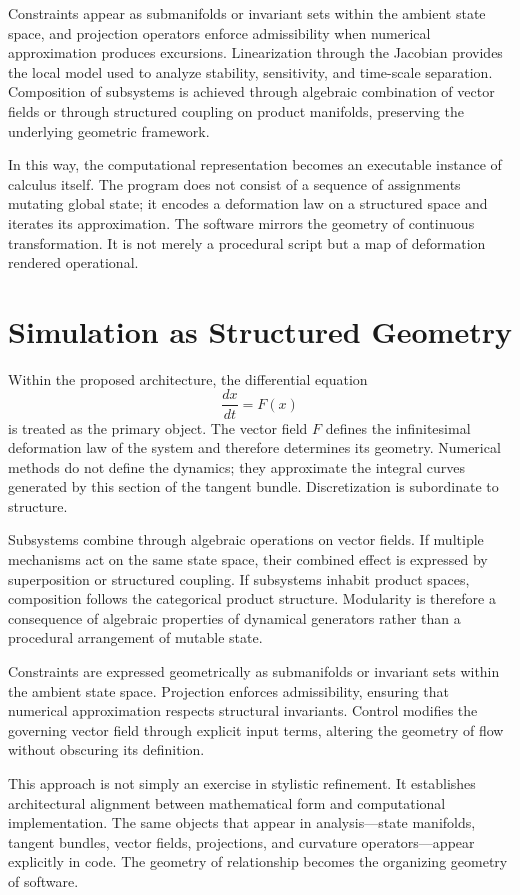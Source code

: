 \documentclass[12pt]{book}
\begin{document}
Constraints appear as submanifolds or invariant sets within the ambient
state space, and projection operators enforce admissibility when
numerical approximation produces excursions. Linearization through the
Jacobian provides the local model used to analyze stability, sensitivity,
and time-scale separation. Composition of subsystems is achieved through
algebraic combination of vector fields or through structured coupling
on product manifolds, preserving the underlying geometric framework.

In this way, the computational representation becomes an executable
instance of calculus itself. The program does not consist of a sequence
of assignments mutating global state; it encodes a deformation law on
a structured space and iterates its approximation. The software mirrors
the geometry of continuous transformation. It is not merely a procedural
script but a map of deformation rendered operational.

\section{Simulation as Structured Geometry}

Within the proposed architecture, the differential equation
\[
\frac{dx}{dt} = F(x)
\]
is treated as the primary object. The vector field $F$ defines the
infinitesimal deformation law of the system and therefore determines
its geometry. Numerical methods do not define the dynamics; they
approximate the integral curves generated by this section of the
tangent bundle. Discretization is subordinate to structure.

Subsystems combine through algebraic operations on vector fields.
If multiple mechanisms act on the same state space, their combined
effect is expressed by superposition or structured coupling.
If subsystems inhabit product spaces, composition follows the
categorical product structure. Modularity is therefore a consequence
of algebraic properties of dynamical generators rather than a
procedural arrangement of mutable state.

Constraints are expressed geometrically as submanifolds or invariant
sets within the ambient state space. Projection enforces admissibility,
ensuring that numerical approximation respects structural invariants.
Control modifies the governing vector field through explicit input
terms, altering the geometry of flow without obscuring its definition.

This approach is not simply an exercise in stylistic refinement.
It establishes architectural alignment between mathematical form
and computational implementation. The same objects that appear in
analysis---state manifolds, tangent bundles, vector fields,
projections, and curvature operators---appear explicitly in code.
The geometry of relationship becomes the organizing geometry of
software.
\end{document}
